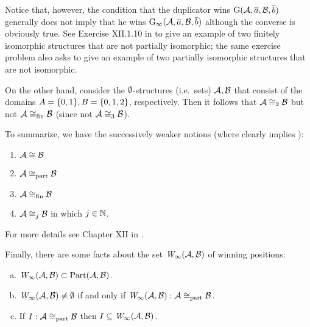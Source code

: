 \begin{enumerate}[1.]
Notice that, however, the condition that the duplicator wins $\mathrm{G}(\mathcal{A}, \overline{a}, \mathcal{B}, \overline{b})$ generally does not imply that he wins $\game{\infty}(\strct{A}, \vect{a}, \strct{B}, \vect{b})$ although the converse is obviously true. See Exercise XII.1.10 in \cite{EFT} to give an example of two finitely isomorphic structures that are not partially isomorphic; the same exercise problem also asks to give an example of two partially isomorphic structures that are not isomorphic.

On the other hand, consider the $\emptyset$-structures (i.e.\ sets) $\mathcal{A}, \mathcal{B}$ that consist of the domains $A = {\{0, 1\}}, B = {\{0, 1, 2\}}$, respectively. Then it follows that $\mathcal{A} \cong_2 \mathcal{B}$ but not $\mathcal{A} \cong_{\mathrm{fin}} \mathcal{B}$ (since not $\mathcal{A} \cong_3 \mathcal{B}$).

To summarize, we have the successively weaker notions (where  clearly implies ):
\begin{enumerate}[(1)]
\item $\mathcal{A} \cong \mathcal{B}$
\item $\mathcal{A} \cong_{\mathrm{part}} \mathcal{B}$
\item $\mathcal{A} \cong_{\mathrm{fin}} \mathcal{B}$
\item $\mathcal{A} \cong_j \mathcal{B}$ in which $j \in \mathbb{N}$.
\end{enumerate}

\begin{remark}
For more details see Chapter XII in \cite{EFT}.
\end{remark}

Finally, there are some facts about the set $\winpos{\infty}(\strct{A}, \strct{B})$ of winning positions: \begin{enumerate}[(a)]
\item $\winpos{\infty}(\strct{A}, \strct{B}) \subset \partisoms(\strct{A}, \strct{B})$.
\item $\winpos{\infty}(\strct{A}, \strct{B}) \neq \emptyset$ if and only if $\winpos{\infty}(\strct{A}, \strct{B}): \strct{A} \isom_\partially \strct{B}$.
\item If $I: \mathcal{A} \cong_{\mathrm{part}} \mathcal{B}$ then $I \subseteq \winpos{\infty}(\strct{A}, \strct{B})$.
\end{enumerate}


\end{enumerate}
